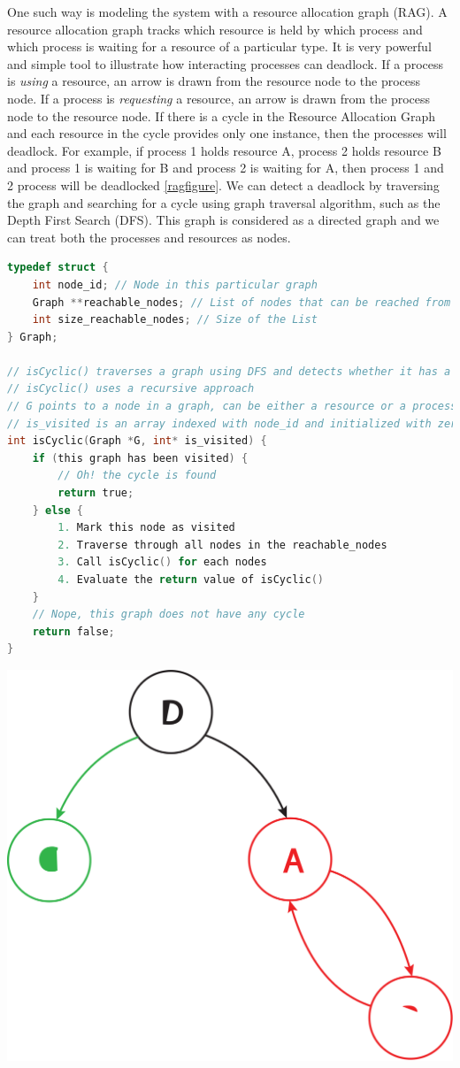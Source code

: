 One such way is modeling the system with a resource allocation graph (\gls{RAG}).
A resource allocation graph tracks which resource is held by which process and which process is waiting for a resource of a particular type.
It is very powerful and simple tool to illustrate how interacting processes can deadlock.
If a process is \emph{using} a resource, an arrow is drawn from the resource node to the process node.
If a process is \emph{requesting} a resource, an arrow is drawn from the process node to the resource node.
If there is a cycle in the Resource Allocation Graph and each resource in the cycle provides only one instance, then the processes will deadlock.
For example, if process 1 holds resource A, process 2 holds resource B and process 1 is waiting for B and process 2 is waiting for A, then process 1 and 2 process will be deadlocked \ref{ragfigure}.
We can detect a deadlock by traversing the graph and searching for a cycle using graph traversal algorithm, such as the Depth First Search (DFS).
This graph is considered as a directed graph and we can treat both the processes and resources as nodes.

\begin{lstlisting}[language=C]
typedef struct {
	int node_id; // Node in this particular graph
	Graph **reachable_nodes; // List of nodes that can be reached from this node
	int size_reachable_nodes; // Size of the List
} Graph;

// isCyclic() traverses a graph using DFS and detects whether it has a cycle
// isCyclic() uses a recursive approach
// G points to a node in a graph, can be either a resource or a process
// is_visited is an array indexed with node_id and initialized with zeroes(false) to record whether a particular node has been visited
int isCyclic(Graph *G, int* is_visited) {
	if (this graph has been visited) {
		// Oh! the cycle is found
		return true;
	} else {
		1. Mark this node as visited
		2. Traverse through all nodes in the reachable_nodes
		3. Call isCyclic() for each nodes
		4. Evaluate the return value of isCyclic()
	}
	// Nope, this graph does not have any cycle
	return false;
}\end{lstlisting}

\begin{center}
\includegraphics[width=.25\textwidth]{deadlock/images/colorful.png}
  \caption{Graph based Deadlock}
\end{center}

